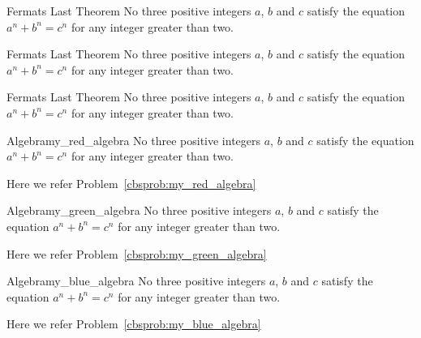 \documentclass[11pt, letterpaper]{../exercise}
\begin{document}
    \begin{cbred}{Fermats Last Theorem}
    No three positive integers \(a\), \(b\) and \(c\) satisfy the equation
    \(a^{n} + b^{n} = c^{n}\) for any integer greater than two.
    \end{cbred}

    \begin{cbgreen}{Fermats Last Theorem}
    No three positive integers \(a\), \(b\) and \(c\) satisfy the equation
    \(a^{n} + b^{n} = c^{n}\) for any integer greater than two.
    \end{cbgreen}

    \begin{cbblue}{Fermats Last Theorem}
    No three positive integers \(a\), \(b\) and \(c\) satisfy the equation
    \(a^{n} + b^{n} = c^{n}\) for any integer greater than two.
    \end{cbblue}

    \begin{cbredproblem}{Algebra}{my_red_algebra}
    No three positive integers \(a\), \(b\) and \(c\) satisfy the equation
    \(a^{n} + b^{n} = c^{n}\) for any integer greater than two.
    \end{cbredproblem}
    Here we refer Problem~\ref{cbsprob:my_red_algebra}%

    \begin{cbgreenproblem}{Algebra}{my_green_algebra}
    No three positive integers \(a\), \(b\) and \(c\) satisfy the equation
    \(a^{n} + b^{n} = c^{n}\) for any integer greater than two.
    \end{cbgreenproblem}
    Here we refer Problem~\ref{cbsprob:my_green_algebra}%

    \begin{cbblueproblem}{Algebra}{my_blue_algebra}
    No three positive integers \(a\), \(b\) and \(c\) satisfy the equation
    \(a^{n} + b^{n} = c^{n}\) for any integer greater than two.
    \end{cbblueproblem}
    Here we refer Problem~\ref{cbsprob:my_blue_algebra}%
\end{document}
